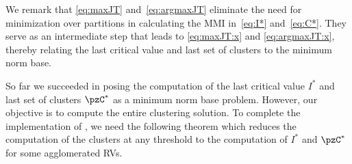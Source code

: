 We remark that \eqref{eq:maxJT} and~\eqref{eq:argmaxJT} eliminate the need for minimization over
partitions in calculating the MMI in~\eqref{eq:I*} and~\eqref{eq:C*}. They serve as an intermediate
step that leads to \eqref{eq:maxJT:x} and \eqref{eq:argmaxJT:x},
thereby relating the last critical value
and last set of clusters 
to the minimum norm base. 

%	
%



So far we succeeded in posing the computation of the last critical value $I^{*}$ and
last set of clusters $\pzC^{*}$ as a minimum norm base problem.
However, our objective is to compute the entire clustering solution.
To complete the implementation of \Agglomerate, we need the following theorem which reduces
the computation of the clusters at any threshold to the computation of $I^*$ and $\pzC^*$ for some
agglomerated RVs.

